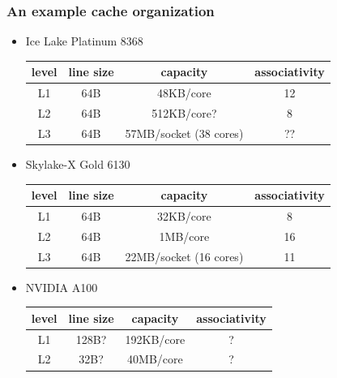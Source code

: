 \documentclass[12pt,dvipdfmx]{beamer}
\newcommand{\ao}[1]{{\color{blue}#1}}
\begin{document}
\begin{frame}
\frametitle{An example cache organization}

\begin{itemize}
\item \ao{Ice Lake Platinum 8368}

\begin{center}
\begin{tabular}{|c|c|c|c|}\hline
level & line size & capacity    & associativity \\\hline
L1    & 64B       & 48KB/core   & 12 \\  
L2    & 64B       & 512KB/core?  & 8 \\  
L3    & 64B       & 57MB/socket (38 cores) & ?? \\  \hline
\end{tabular}
\end{center}

\item Skylake-X Gold 6130

\begin{center}
\begin{tabular}{|c|c|c|c|}\hline
level & line size & capacity    & associativity \\\hline
L1    & 64B       & 32KB/core   & 8 \\  
L2    & 64B       & 1MB/core    & 16 \\  
L3    & 64B       & 22MB/socket (16 cores) & 11 \\  \hline
\end{tabular}
\end{center}

\item \ao{NVIDIA A100}

\begin{center}
\begin{tabular}{|c|c|c|c|}\hline
level & line size & capacity    & associativity \\\hline
L1    & 128B?     & 192KB/core  & ? \\  
L2    & 32B?      & 40MB/core   & ? \\  \hline
\end{tabular}
\end{center}




\end{itemize}
\end{frame}
\end{document}
